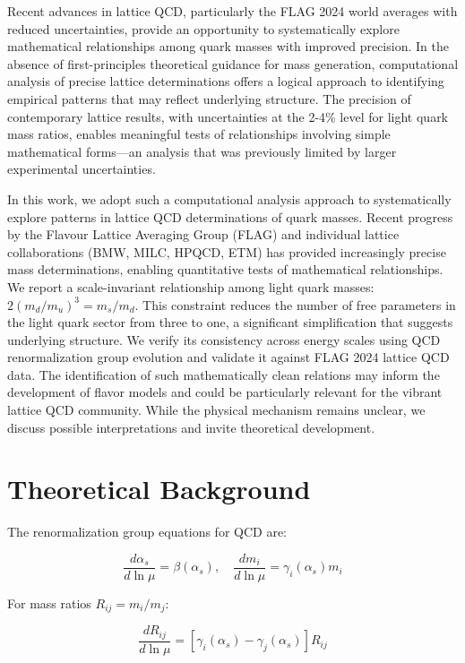 \documentclass[12pt]{article}
\begin{document}
Recent advances in lattice QCD, particularly the FLAG 2024 world averages with reduced uncertainties, provide an opportunity to systematically explore mathematical relationships among quark masses with improved precision. In the absence of first-principles theoretical guidance for mass generation, computational analysis of precise lattice determinations offers a logical approach to identifying empirical patterns that may reflect underlying structure. The precision of contemporary lattice results, with uncertainties at the 2-4\% level for light quark mass ratios, enables meaningful tests of relationships involving simple mathematical forms—an analysis that was previously limited by larger experimental uncertainties.

In this work, we adopt such a computational analysis approach to systematically explore patterns in lattice QCD determinations of quark masses. Recent progress by the Flavour Lattice Averaging Group (FLAG) and individual lattice collaborations (BMW, MILC, HPQCD, ETM) has provided increasingly precise mass determinations, enabling quantitative tests of mathematical relationships. We report a scale-invariant relationship among light quark masses: $2(m_d/m_u)^3 = m_s/m_d$. This constraint reduces the number of free parameters in the light quark sector from three to one, a significant simplification that suggests underlying structure. We verify its consistency across energy scales using QCD renormalization group evolution and validate it against FLAG 2024 lattice QCD data. The identification of such mathematically clean relations may inform the development of flavor models and could be particularly relevant for the vibrant lattice QCD community. While the physical mechanism remains unclear, we discuss possible interpretations and invite theoretical development.

\section{Theoretical Background}

The renormalization group equations for QCD are:

\begin{equation}
\frac{d\alpha_s}{d\ln\mu} = \beta(\alpha_s),\quad \frac{dm_i}{d\ln\mu} = \gamma_i(\alpha_s)m_i
\end{equation}

For mass ratios $R_{ij} = m_i/m_j$:

\begin{equation}
\frac{dR_{ij}}{d\ln\mu} = [\gamma_i(\alpha_s) - \gamma_j(\alpha_s)]R_{ij}
\end{equation}
\end{document}
